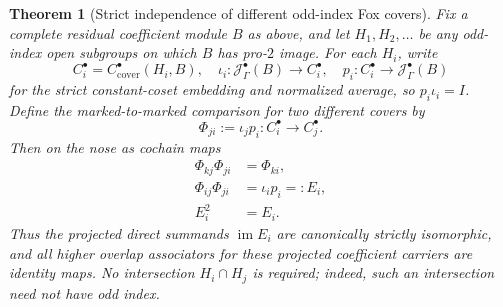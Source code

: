 \documentclass[11pt]{article}
\newtheorem{theorem}{Theorem}[section]
\theoremstyle{definition}
\begin{document}
\begin{theorem}[Strict independence of different odd-index Fox covers]
\label{thm:dyadic-f135-cross-sylow-strict-coherence}
Fix a complete
residual coefficient
module $B$ as above,
and let
$H_1,H_2,\ldots$
be \emph{any}
odd-index open
subgroups on which
$B$ has pro-$2$
image.
For each $H_i$,
write
\[
C_i^\bullet
=C_{\mathrm{cover}}^\bullet(H_i,B),
\quad
\iota_i:\mathcal J_\Gamma^\bullet(B)\to C_i^\bullet,
\quad
p_i:C_i^\bullet\to\mathcal J_\Gamma^\bullet(B)
\]
for the strict
constant-coset
embedding and
normalized average,
so $p_i\iota_i=I$.
Define the
marked-to-marked
comparison for
two different
covers by
\begin{equation}\label{eq:dyadic-f135-cover-change-operations}
\boxed{\qquad
\Phi_{ji}:=\iota_jp_i:
C_i^\bullet\longrightarrow C_j^\bullet.
\qquad}
\end{equation}
Then \emph{on the
nose as cochain maps}
\begin{equation}\label{eq:dyadic-f135-strict-transitive-odd-covers}
\boxed{
\begin{aligned}
\Phi_{kj}\Phi_{ji}&=\Phi_{ki},\\
\Phi_{ij}\Phi_{ji}
&=\iota_i p_i=:E_i,\\
E_i^2&=E_i.
\end{aligned}}
\end{equation}
Thus the projected
direct summands
$\operatorname{im}E_i$
are canonically
strictly isomorphic,
and \emph{all}
higher overlap
associators for
these projected
coefficient
carriers are
identity maps.
No intersection
$H_i\cap H_j$
is required;
indeed, such an
intersection
need not have
odd index.


\end{theorem}
\end{document}
